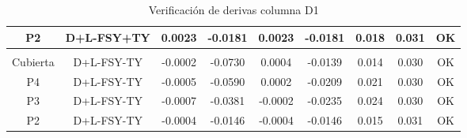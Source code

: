 \begin{table}[H]
{\begin{tabular}{|c|c|c|c|c|c|c|c|c|}
    \hline
    P2  & D+L-FSY+TY & 0.0023 & -0.0181 & 0.0023 & -0.0181 & 0.018 & 0.031 & \cellcolor[rgb]{ .776,  .937,  .808}\textcolor[rgb]{ 0,  .38,  0}{OK} \bigstrut\\
    \hline
    \multicolumn{1}{|r}{} & \multicolumn{1}{r}{} & \multicolumn{1}{r}{} & \multicolumn{1}{r}{} & \multicolumn{1}{r}{} & \multicolumn{1}{r}{} & \multicolumn{1}{r}{} & \multicolumn{1}{r}{} &  \bigstrut\\
    \hline
    Cubierta & D+L-FSY-TY & -0.0002 & -0.0730 & 0.0004 & -0.0139 & 0.014 & 0.030 & \cellcolor[rgb]{ .776,  .937,  .808}\textcolor[rgb]{ 0,  .38,  0}{OK} \bigstrut\\
    \hline
    P4  & D+L-FSY-TY & -0.0005 & -0.0590 & 0.0002 & -0.0209 & 0.021 & 0.030 & \cellcolor[rgb]{ .776,  .937,  .808}\textcolor[rgb]{ 0,  .38,  0}{OK} \bigstrut\\
    \hline
    P3  & D+L-FSY-TY & -0.0007 & -0.0381 & -0.0002 & -0.0235 & 0.024 & 0.030 & \cellcolor[rgb]{ .776,  .937,  .808}\textcolor[rgb]{ 0,  .38,  0}{OK} \bigstrut\\
    \hline
    P2  & D+L-FSY-TY & -0.0004 & -0.0146 & -0.0004 & -0.0146 & 0.015 & 0.031 & \cellcolor[rgb]{ .776,  .937,  .808}\textcolor[rgb]{ 0,  .38,  0}{OK} \bigstrut\\
    \hline
    \end{tabular}}%
  \caption{Verificación de derivas columna D1}
  \label{tab:VDD1}%
\end{table}%
